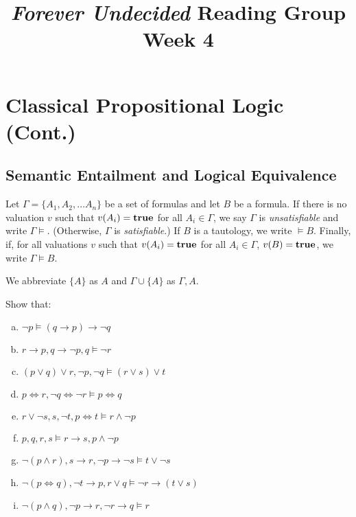 \documentclass{article}
\title{\emph{Forever Undecided} Reading Group \\ Week 4}
\date{}
\author{}
\begin{document}
\maketitle

\section*{Classical Propositional Logic (Cont.)}

\subsection*{Semantic Entailment and Logical Equivalence}

\begin{definition}
    Let $\Gamma = \{A_1, A_2, \dots A_n \}$ be a set of formulas and let $B$ be a formula. If there is no valuation $v$ such that $v(A_i) = \mathbf{true}$ for all $A_i \in \Gamma$, we say $\Gamma$ is \emph{unsatisfiable} and write $\Gamma \models$. (Otherwise, $\Gamma$ is \emph{satisfiable}.) If $B$ is a tautology, we write $\models B$. Finally, if, for all valuations $v$ such that $v(A_i) = \mathbf{true}$ for all $A_i \in \Gamma$, $v(B) = \mathbf{true}$, we write $\Gamma \models B$. 
\end{definition}

\begin{notation} 
    We abbreviate $\{ A \}$ as $A$ and $\Gamma \cup \{ A \}$ as $\Gamma, A$.
\end{notation}

\begin{prob}{4.1}
    Show that:
    \begin{multicols}{2}
    \begin{enumerate}[a)]
    \item $\neg p \models (q \to p) \to \neg q$
    \item ${r \to p}, {q \to \neg p}, q \models \neg r$
    \item $(p \vee q) \vee r, \neg p, \neg q \models (r \vee s) \vee t$
    \item ${p \iff r}, {\neg q \iff \neg r} \models {p \iff q}$
    \item ${r \vee \neg s}, s, \neg t, {p \iff t} \models {r \wedge \neg p}$
    \item $p, q, r, s \models {r \to s}, {p \wedge \neg p}$
    \item ${\neg (p \wedge r)}, {s \to r}, {\neg p \to \neg s} \models t \vee {\neg s}$
    \item ${\neg (p \iff q)}, {\neg t \to p}, {r \vee q} \models {\neg r \to (t \vee s)}$
    \item ${\neg (p \wedge q)}, {\neg p \to r}, {\neg r \to q} \models r$
    \end{enumerate}
    \end{multicols}
\end{prob}
\end{document}
